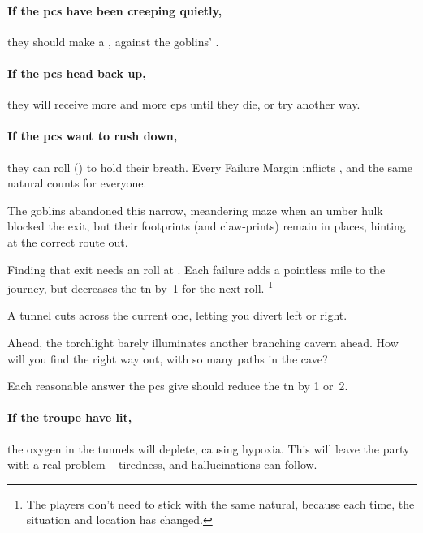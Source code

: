 \begin{multicols}{2}
\paragraph{If the \glspl{pc} have been creeping quietly,}
they should make a , against the goblins' .

\paragraph{If the \glspl{pc} head back up,}
they will receive more and more \glspl{ep} until they die, or try another way.

\paragraph{If the \glspl{pc} want to rush down,}
they can roll  (\tn[10]) to hold their breath.
Every Failure Margin inflicts , and the same \gls{natural} counts for everyone.



The goblins abandoned this narrow, meandering maze when an umber hulk blocked the exit, but their footprints (and claw-prints) remain in places, hinting at the correct route out.

Finding that exit needs an  roll at \tn[10].
Each failure adds a pointless mile to the journey, but decreases the \gls{tn} by~1 for the next roll.%
\footnote{The players don't need to stick with the same \gls{natural}, because each time, the situation and location has changed.}

\begin{boxtext}
  A tunnel cuts across the current one, letting you divert left or right.

  Ahead, the torchlight barely illuminates another branching cavern ahead.
  How will you find the right way out, with so many paths in the cave?
\end{boxtext}

Each reasonable answer the \glspl{pc} give should reduce the \gls{tn} by 1 or~2.

\paragraph{If the troupe have  lit,}
the oxygen in the tunnels will deplete, causing \gls{hypoxia}.
This will leave the party with a real problem -- tiredness, and hallucinations can follow.


\end{multicols}
